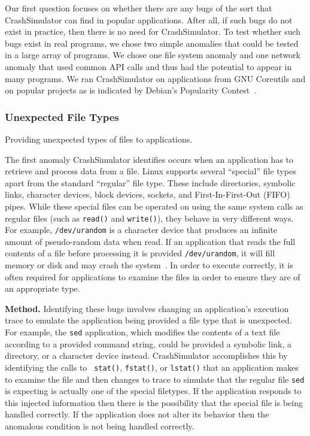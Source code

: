 Our first question focuses on whether there are any bugs of the sort that
CrashSimulator can find in popular applications.  After all, if such bugs
do not exist in practice, then there is no need for CrashSimulator.
To test whether such bugs exist in real programs, we 
chose two simple anomalies that could be tested in a large
array of programs.  We chose one file system anomaly and one network anomaly 
that used common API calls and thus had the potential to appear in
many programs.  We ran CrashSimulator on applications from GNU Coreutils and
on popular projects as is indicated by Debian's Popularity Contest~\cite{DebPopCon}.

\subsubsection{Unexpected File Types} Providing unexpected types of files to
applications.

The first anomaly CrashSimulator identifies occurs when an
application has to retrieve and process data from a file.  Linux supports
several ``special'' file types apart from the standard ``regular'' file type.
These include directories, symbolic links, character devices, block devices,
sockets, and First-In-First-Out (FIFO) pipes.  While these special files can
be operated on using the same system calls as regular files 
(such as {\tt read()} and {\tt write()}), they behave in very different
ways.  For example, {\tt /dev/urandom} is a character device that produces
an infinite amount of pseudo-random data when read.
If an application that reads the full contents of a file
before processing it is provided {\tt /dev/urandom}, it will fill memory
or disk and may crash the system~\cite{YumAptEndless}.
In order to execute correctly, it is often required for applications to 
examine the files in order to ensure they are of an appropriate type.

{\bf Method.}  Identifying these bugs involves changing an application's
execution trace to emulate the application being provided a file type that is
unexpected.  For example, the {\tt sed} application, which modifies the contents
of a text file according to a provided command string, could be provided
a symbolic link, a directory, or a character device
instead.  CrashSimulator accomplishes this by identifying the calls to {\tt
  stat()}, {\tt fstat()}, or {\tt lstat()} that an application makes to examine
the file and then changes to trace to simulate that the regular file {\tt sed}
is expecting is actually one of the special filetypes.  If the application
responds to this injected information then there is the possibility that the
special file is being handled correctly.  If the application does not alter its
behavior then the anomalous condition is not being handled correctly.

